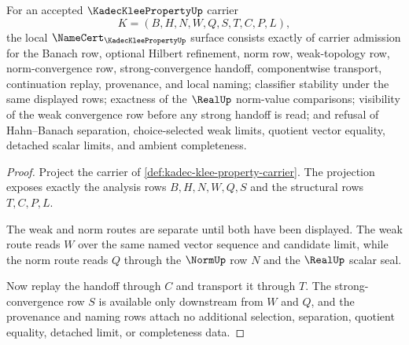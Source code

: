 \begin{theorem}
\label{thm:kadec-klee-property-namecert-obligations}
For an accepted $\KadecKleePropertyUp$ carrier
$$
K=(B,H,N,W,Q,S,T,C,P,L),
$$
the local $\NameCert_{\KadecKleePropertyUp}$ surface consists exactly of carrier admission for the Banach row, optional Hilbert refinement, norm row, weak-topology row, norm-convergence row, strong-convergence handoff, componentwise transport, continuation replay, provenance, and local naming; classifier stability under the same displayed rows; exactness of the $\RealUp$ norm-value comparisons; visibility of the weak convergence row before any strong handoff is read; and refusal of Hahn--Banach separation, choice-selected weak limits, quotient vector equality, detached scalar limits, and ambient completeness.
\end{theorem}
\begin{proof}
Project the carrier of \autoref{def:kadec-klee-property-carrier}. The projection exposes exactly the analysis rows $B,H,N,W,Q,S$ and the structural rows $T,C,P,L$.

The weak and norm routes are separate until both have been displayed. The weak route reads $W$ over the same named vector sequence and candidate limit, while the norm route reads $Q$ through the $\NormUp$ row $N$ and the $\RealUp$ scalar seal.

Now replay the handoff through $C$ and transport it through $T$. The strong-convergence row $S$ is available only downstream from $W$ and $Q$, and the provenance and naming rows attach no additional selection, separation, quotient equality, detached limit, or completeness data.
\end{proof}

